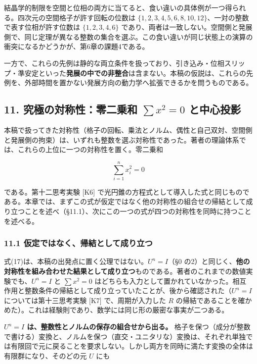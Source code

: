 \documentclass[
  a4paper,
]{ltjsarticle}
\begin{document}
結晶学的制限を空間と位相の両方に当てると、食い違いの具体例が一つ得られる。四次元の空間格子が許す回転の位数は
\(\{1,2,3,4,5,6,8,10,12\}\)、一対の整数で表す位相が許す位数は
\(\{1,2,3,4,6\}\)
であり、両者は一致しない。空間側と発展側で、同じ定理が異なる整数の集合を選ぶ。この食い違いが同じ状態上の演算の衝突になるかどうかが、第6章の課題4である。

一方で、これらの先例は静的な両立条件を扱っており、引き込み・位相スリップ・準安定といった\textbf{発展の中での非整合}は含まない。本稿の仮説は、これらの先例を、外部時間を置かない発展方向の動力学へ拡張できるかを問うものである。

\subsection{\texorpdfstring{11. 究極の対称性：零二乗和 \(\sum x^2=0\)
と中心投影}{11. 究極の対称性：零二乗和 \textbackslash sum x\^{}2=0 と中心投影}}\label{ux7a76ux6975ux306eux5bfeux79f0ux6027ux96f6ux4e8cux4e57ux548c-sum-x20-ux3068ux4e2dux5fc3ux6295ux5f71}

本稿で扱ってきた対称性（格子の回転、乗法とノルム、偶性と自己双対、空間側と発展側の拘束）は、いずれも整数を選ぶ対称性であった。著者の理論体系では、これらの上位に一つの対称性を置く。零二乗和

\[
\sum_{i=1}^{n}x_i^2=0
\tag{17}
\]

である。第十二思考実験 {[}K6{]}
で光円錐の方程式として導入した式と同じものである。本章では、まずこの式が仮定ではなく他の対称性の組合せの帰結として成り立つことを述べ（§11.1）、次にこの一つの式が四つの対称性を同時に持つことを述べる。

\subsubsection{11.1
仮定ではなく、帰結として成り立つ}\label{ux4eeeux5b9aux3067ux306fux306aux304fux5e30ux7d50ux3068ux3057ux3066ux6210ux308aux7acbux3064}

式(17)は、本稿の出発点に置く公理ではない。\(U^n=I\)（§0
の2）と同じく、\textbf{他の対称性を組み合わせた結果として成り立つ}ものである。著者のこれまでの数値実験でも、\(U^n=I\)
と \(\sum x^2=0\)
はどちらも入力として置かれていなかった。相互作用と整数条件の帰結として成り立っていたことが、後から確認された（\(U^n=I\)
については第十三思考実験 {[}K7{]} で、周期が入力した \(R\)
の帰結であることを確かめた）。これは経験則であり、数学には同じ形の厳密な事実が二つある。

\textbf{\(U^n=I\) は、整数性とノルムの保存の組合せから出る。}
格子を保つ（成分が整数で書ける）変換と、ノルムを保つ（直交・ユニタリな）変換は、それぞれ単独では有限回で元に戻ることを要求しない。しかし両方を同時に満たす変換の全体は有限群になり、そのどの元
\(U\) にも
\end{document}
